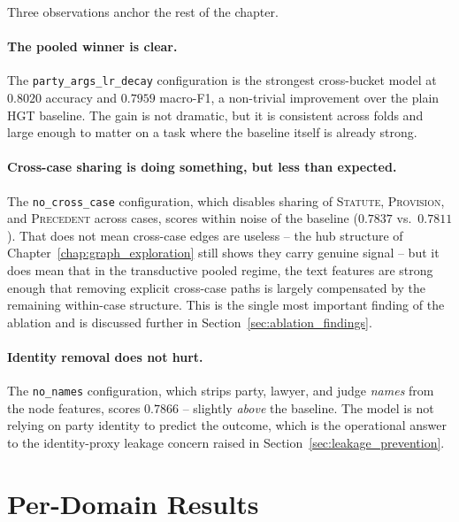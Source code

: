 Three observations anchor the rest of the chapter.

\paragraph{The pooled winner is clear.} The
\texttt{party\_args\_lr\_decay} configuration is the strongest
cross-bucket model at $0.8020$ accuracy and $0.7959$ macro-F1, a
non-trivial improvement over the plain HGT baseline. The gain is not
dramatic, but it is consistent across folds and large enough to matter
on a task where the baseline itself is already strong.

\paragraph{Cross-case sharing is doing something, but less than
expected.} The \texttt{no\_cross\_case} configuration, which disables
sharing of \textsc{Statute}, \textsc{Provision}, and \textsc{Precedent}
across cases, scores within noise of the baseline ($0.7837$ vs.\
$0.7811$). That does not mean cross-case edges are useless -- the hub
structure of Chapter~\ref{chap:graph_exploration} still shows they
carry genuine signal -- but it does mean that in the transductive
pooled regime, the text features are strong enough that removing
explicit cross-case paths is largely compensated by the remaining
within-case structure. This is the single most important finding of
the ablation and is discussed further in
Section~\ref{sec:ablation_findings}.

\paragraph{Identity removal does not hurt.} The \texttt{no\_names}
configuration, which strips party, lawyer, and judge \emph{names}
from the node features, scores $0.7866$ -- slightly \emph{above} the
baseline. The model is not relying on party identity to predict the
outcome, which is the operational answer to the identity-proxy
leakage concern raised in Section~\ref{sec:leakage_prevention}.

\section{Per-Domain Results}

